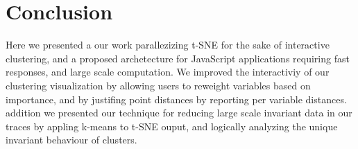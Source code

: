 \section{Conclusion}
\label{sec:conclusion}

Here we presented a our work parallezizing t-SNE for the sake of
interactive clustering, and a proposed archetecture for JavaScript
applications requiring fast responses, and large scale computation. We
improved the interactiviy of our clustering visualization by allowing
users to reweight variables based on importance, and by justifing
point distances by reporting per variable distances.  addition we
presented our technique for reducing large scale invariant data in our
traces by appling k-means to t-SNE ouput, and logically analyzing the
unique invariant behaviour of clusters.

